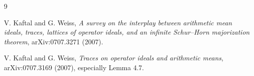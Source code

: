 \documentclass[11pt]{article}
\begin{document}
\enlargethispage{5\baselineskip}
\small
\begin{thebibliography}{9}

V. Kaftal and G. Weiss,
\emph{A survey on the interplay between arithmetic mean ideals, traces,
lattices of operator ideals, and an infinite Schur--Horn majorization
theorem}, arXiv:0707.3271 (2007).

V. Kaftal and G. Weiss,
\emph{Traces on operator ideals and arithmetic means},
arXiv:0707.3169 (2007), especially Lemma 4.7.

\end{thebibliography}
\normalsize
\end{document}
